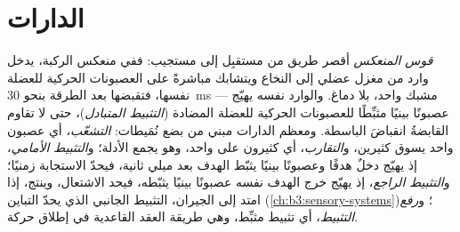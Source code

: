\section{الدارات}

\begin{definition}\label{def:b3:nervous-systems:circuits}
\emph{قوس المنعكس} أقصر طريق من مستقبِل إلى مستجيب: ففي
منعكس الركبة، يدخل وارد من مغزل عضلي إلى النخاع ويتشابك
مباشرةً على العصبونات الحركية للعضلة نفسها، فتقبضها بعد
الطرقة بنحو \qty{30}{ms} --- مشبك واحد، بلا دماغ. والوارد
نفسه يهيّج عصبونًا بينيًا مثبِّطًا للعصبونات الحركية للعضلة
المضادة (\emph{التثبيط المتبادل})، حتى لا تقاوم القابضةُ
انقباضَ الباسطة. ومعظم الدارات مبني من بضع نُمَيطات:
\emph{التشعّب}، أي عصبون واحد يسوق كثيرين، و\emph{التقارب}،
أي كثيرون على واحد، وهو يجمع الأدلة؛ و\emph{التثبيط
الأمامي}، إذ يهيّج دخلٌ هدفًا وعصبونًا بينيًا يثبّط الهدف
بعد ميلي ثانية، فيحدّ الاستجابة زمنيًا؛ و\emph{التثبيط
الراجع}، إذ يهيّج خرج الهدف نفسه عصبونًا بينيًا يثبّطه،
فيحد الاشتعال، وينتج، إذا امتد إلى الجيران، التثبيط الجانبي
الذي يحدّ التباين (\cref{ch:b3:sensory-systems})؛ و\emph{رفع
التثبيط}، أي تثبيط مثبِّط، وهي طريقة العقد القاعدية في إطلاق
حركة.
\end{definition}

